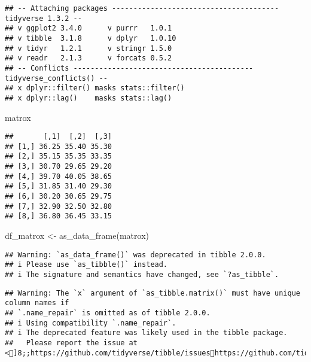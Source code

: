 \documentclass[
]{article}
\newenvironment{Shaded}{\begin{snugshade}}{\end{snugshade}}
\newcommand{\FunctionTok}[1]{\textcolor[rgb]{0.00,0.00,0.00}{#1}}
\newcommand{\NormalTok}[1]{#1}
\newcommand{\OtherTok}[1]{\textcolor[rgb]{0.56,0.35,0.01}{#1}}
\begin{document}
\begin{verbatim}
## -- Attaching packages --------------------------------------- tidyverse 1.3.2 --
## v ggplot2 3.4.0      v purrr   1.0.1 
## v tibble  3.1.8      v dplyr   1.0.10
## v tidyr   1.2.1      v stringr 1.5.0 
## v readr   2.1.3      v forcats 0.5.2 
## -- Conflicts ------------------------------------------ tidyverse_conflicts() --
## x dplyr::filter() masks stats::filter()
## x dplyr::lag()    masks stats::lag()
\end{verbatim}

\begin{Shaded}
\begin{Highlighting}[]
\NormalTok{matrox}
\end{Highlighting}
\end{Shaded}

\begin{verbatim}
##       [,1]  [,2]  [,3]
## [1,] 36.25 35.40 35.30
## [2,] 35.15 35.35 33.35
## [3,] 30.70 29.65 29.20
## [4,] 39.70 40.05 38.65
## [5,] 31.85 31.40 29.30
## [6,] 30.20 30.65 29.75
## [7,] 32.90 32.50 32.80
## [8,] 36.80 36.45 33.15
\end{verbatim}

\begin{Shaded}
\begin{Highlighting}[]
\NormalTok{df\_matrox }\OtherTok{\textless{}{-}} \FunctionTok{as\_data\_frame}\NormalTok{(matrox)}
\end{Highlighting}
\end{Shaded}

\begin{verbatim}
## Warning: `as_data_frame()` was deprecated in tibble 2.0.0.
## i Please use `as_tibble()` instead.
## i The signature and semantics have changed, see `?as_tibble`.
\end{verbatim}

\begin{verbatim}
## Warning: The `x` argument of `as_tibble.matrix()` must have unique column names if
## `.name_repair` is omitted as of tibble 2.0.0.
## i Using compatibility `.name_repair`.
## i The deprecated feature was likely used in the tibble package.
##   Please report the issue at <]8;;https://github.com/tidyverse/tibble/issueshttps://github.com/tidyverse/tibble/issues]8;;>.
\end{verbatim}
\end{document}
